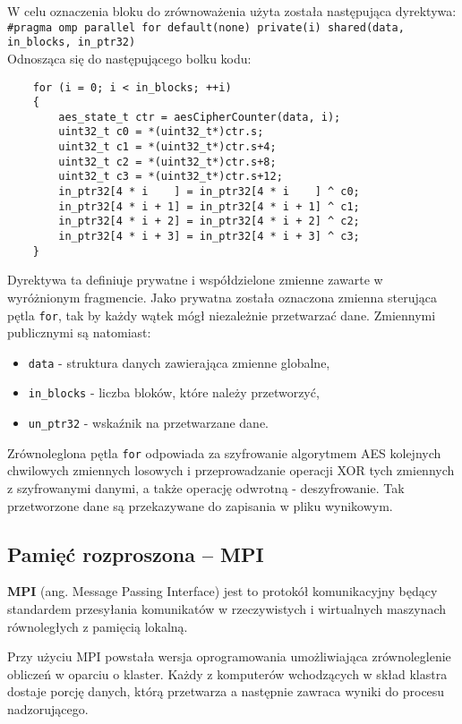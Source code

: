 \documentclass[a4paper,12pt]{article}
\begin{document}
W celu oznaczenia bloku do zrównoważenia użyta została następująca dyrektywa: \\
 \texttt{\#pragma omp parallel for default(none) private(i) shared(data, in\_blocks, in\_ptr32)}\\
Odnosząca się do następującego bolku kodu:\\
\begin{lstlisting}
	for (i = 0; i < in_blocks; ++i)
	{
		aes_state_t ctr = aesCipherCounter(data, i);
		uint32_t c0 = *(uint32_t*)ctr.s;
		uint32_t c1 = *(uint32_t*)ctr.s+4;
		uint32_t c2 = *(uint32_t*)ctr.s+8;
		uint32_t c3 = *(uint32_t*)ctr.s+12;
		in_ptr32[4 * i    ] = in_ptr32[4 * i    ] ^ c0;
		in_ptr32[4 * i + 1] = in_ptr32[4 * i + 1] ^ c1;
		in_ptr32[4 * i + 2] = in_ptr32[4 * i + 2] ^ c2;
		in_ptr32[4 * i + 3] = in_ptr32[4 * i + 3] ^ c3;
	}
\end{lstlisting}

Dyrektywa ta definiuje prywatne i współdzielone zmienne zawarte w wyróżnionym fragmencie. Jako prywatna została oznaczona zmienna sterująca pętla \texttt{for}, tak by każdy wątek mógł niezależnie przetwarzać dane. Zmiennymi publicznymi są natomiast:
\begin{itemize}
\item \texttt{data} - struktura danych zawierająca zmienne globalne,
\item \texttt{in\_blocks} - liczba bloków, które należy przetworzyć,
\item \texttt{un\_ptr32} - wskaźnik na przetwarzane dane.
\end{itemize}

Zrównoleglona pętla  \texttt{for} odpowiada za szyfrowanie algorytmem AES kolejnych chwilowych zmiennych losowych i przeprowadzanie operacji XOR tych zmiennych z szyfrowanymi danymi, a także operację odwrotną - deszyfrowanie. Tak przetworzone dane są przekazywane do zapisania w pliku wynikowym.

\subsection{Pamięć rozproszona -- MPI}
\textbf{MPI} (ang. Message Passing Interface) jest to protokół komunikacyjny będący standardem przesyłania komunikatów w rzeczywistych i wirtualnych maszynach równoległych z pamięcią lokalną.

Przy użyciu MPI powstała wersja oprogramowania umożliwiająca zrównoleglenie obliczeń  w oparciu o klaster.  Każdy z komputerów wchodzących w skład klastra dostaje porcję danych, którą przetwarza a następnie zawraca wyniki do procesu nadzorującego.
\end{document}
